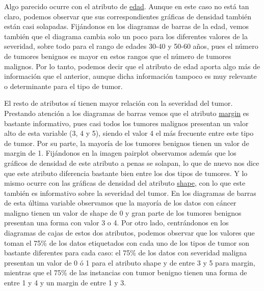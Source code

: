 \documentclass[a4paper,11pt]{book}
\begin{document}
Algo parecido ocurre con el atributo de \underline{edad}. Aunque en este caso no está tan claro, podemos observar que sus correspondientes gráficas de densidad también están casi solapadas. Fijándonos en los diagramas de barras de la edad, vemos también que el diagrama cambia solo un poco para los diferentes valores de la severidad, sobre todo para el rango de edades 30-40 y 50-60 años, pues el número de tumores benignos es mayor en estos rangos que el número de tumores malignos. Por lo tanto, podemos decir que el atributo de edad aporta algo más de información que el anterior, aunque dicha información tampoco es muy relevante o determinante para el tipo de tumor. 

El resto de atributos sí tienen mayor relación con la severidad del tumor. Prestando atención a los diagramas de barras vemos que el atributo \underline{margin} es bastante informativo, pues casi todos los tumores malignos presentan un valor alto de esta variable (3, 4 y 5), siendo el valor 4 el más frecuente entre este tipo de tumor. Por su parte, la mayoría de los tumores benignos tienen un valor de margin de 1. Fijándonos en la imagen pairplot observamos además que los gráficos de densidad de este atributo a penas se solapan, lo que de nuevo nos dice que este atributo diferencia bastante bien entre los dos tipos de tumores. Y lo mismo ocurre con las gráficas de densidad del atributo \underline{shape}, con lo que este también es informativo sobre la severidad del tumor. En los diagramas de barras de esta última variable observamos que la mayoría de los datos con cáncer maligno tienen un valor de shape de 0 y gran parte de los tumores benignos presentan una forma con valor 3 o 4. Por otro lado, centrándonos en los diagramas de cajas de estos dos atributos, podemos observar que los valores que toman el 75\% de los datos etiquetados con cada uno de los tipos de tumor son bastante diferentes para cada caso: el 75\% de los datos con severidad maligna presentan un valor de 0 ó 1 para el atributo shape y de entre 3 y 5 para margin, mientras que el 75\% de las instancias con tumor benigno tienen una forma de entre 1 y 4 y un margin de entre 1 y 3. 
\end{document}
